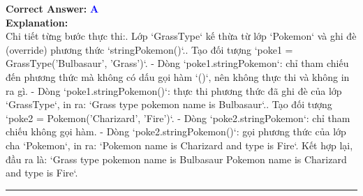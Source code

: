 \documentclass[11pt,a4paper]{article}
\begin{document}
\begin{minipage}{\textwidth}
\noindent \textbf{Correct Answer:} \textcolor{blue}{\textbf{A}} \\[4pt]
\noindent \textbf{Explanation:}\\
Chi tiết từng bước thực thi:. Lớp `GrassType` kế thừa từ lớp `Pokemon` và ghi đè (override) phương thức `stringPokemon()`.. Tạo đối tượng `poke1 = GrassType('Bulbasaur', 'Grass')`.\newline
   - Dòng `poke1.stringPokemon`: chỉ tham chiếu đến phương thức mà không có dấu gọi hàm `()`, nên không thực thi và không in ra gì.\newline
   - Dòng `poke1.stringPokemon()`: thực thi phương thức đã ghi đè của lớp `GrassType`, in ra: `Grass type pokemon name is Bulbasaur`.. Tạo đối tượng `poke2 = Pokemon('Charizard', 'Fire')`.\newline
   - Dòng `poke2.stringPokemon`: chỉ tham chiếu không gọi hàm.\newline
   - Dòng `poke2.stringPokemon()`: gọi phương thức của lớp cha `Pokemon`, in ra: `Pokemon name is Charizard and type is Fire`.\newline
Kết hợp lại, đầu ra là: `Grass type pokemon name is Bulbasaur Pokemon name is Charizard and type is Fire`.
\end{minipage}
\vspace{0.8cm}
\hrule
\vspace{0.5cm}
\end{document}
